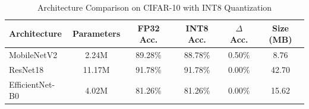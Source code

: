 \begin{table}[h]
\centering
\caption{Architecture Comparison on CIFAR-10 with INT8 Quantization}
\label{tab:architecture_comparison}
\begin{tabular}{lccccc}
\hline
\textbf{Architecture} & \textbf{Parameters} & \textbf{FP32 Acc.} & \textbf{INT8 Acc.} & \textbf{$\Delta$ Acc.} & \textbf{Size (MB)} \\
\hline
MobileNetV2 & 2.24M & 89.28\% & 88.78\% & 0.50\% & 8.76 \\
ResNet18 & 11.17M & 91.78\% & 91.78\% & 0.00\% & 42.70 \\
EfficientNet-B0 & 4.02M & 81.26\% & 81.26\% & 0.00\% & 15.62 \\
\hline
\end{tabular}
\end{table}
